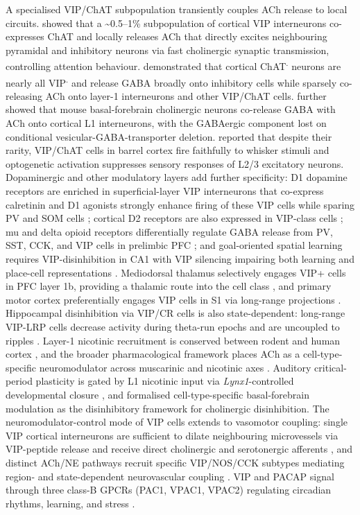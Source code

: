 \documentclass[11pt]{article}
\begin{document}
A specialised VIP/ChAT subpopulation transiently couples ACh release to local circuits. \citet{Obermayer2019} showed that a {\textasciitilde}0.5--1\% subpopulation of cortical VIP interneurons co-expresses ChAT and locally releases ACh that directly excites neighbouring pyramidal and inhibitory neurons via fast cholinergic synaptic transmission, controlling attention behaviour. \citet{Granger2020} demonstrated that cortical ChAT\textsuperscript{.} neurons are nearly all VIP\textsuperscript{.} and release GABA broadly onto inhibitory cells while sparsely co-releasing ACh onto layer-1 interneurons and other VIP/ChAT cells. \citet{Saunders2015} further showed that mouse basal-forebrain cholinergic neurons co-release GABA with ACh onto cortical L1 interneurons, with the GABAergic component lost on conditional vesicular-GABA-transporter deletion. \citet{Dudai2020} reported that despite their rarity, VIP/ChAT cells in barrel cortex fire faithfully to whisker stimuli and optogenetic activation suppresses sensory responses of L2/3 excitatory neurons. Dopaminergic and other modulatory layers add further specificity: D1 dopamine receptors are enriched in superficial-layer VIP interneurons that co-express calretinin and D1 agonists strongly enhance firing of these VIP cells while sparing PV and SOM cells \citep{Anastasiades2019}; cortical D2 receptors are also expressed in VIP-class cells \citep{Khlghatyan2019}; mu and delta opioid receptors differentially regulate GABA release from PV, SST, CCK, and VIP cells in prelimbic PFC \citep{Cole2025}; and goal-oriented spatial learning requires VIP-disinhibition in CA1 with VIP silencing impairing both learning and place-cell representations \citep{Turi2019}. Mediodorsal thalamus selectively engages VIP+ cells in PFC layer 1b, providing a thalamic route into the cell class \citep{Anastasiades2021a}, and primary motor cortex preferentially engages VIP cells in S1 via long-range projections \citep{Naskar2021}. Hippocampal disinhibition via VIP/CR cells is also state-dependent: long-range VIP-LRP cells decrease activity during theta-run epochs and are uncoupled to ripples \citep{Francavilla2018a}. Layer-1 nicotinic recruitment is conserved between rodent and human cortex \citep{Poorthuis2018}, and the broader pharmacological framework places ACh as a cell-type-specific neuromodulator across muscarinic and nicotinic axes \citep{Picciotto2012}. Auditory critical-period plasticity is gated by L1 nicotinic input via \textit{Lynx1}-controlled developmental closure \citep{Takesian2018}, and \citet{Alitto2013} formalised cell-type-specific basal-forebrain modulation as the disinhibitory framework for cholinergic disinhibition. The neuromodulator-control mode of VIP cells extends to vasomotor coupling: single VIP cortical interneurons are sufficient to dilate neighbouring microvessels via VIP-peptide release and receive direct cholinergic and serotonergic afferents \citep{Cauli2004}, and distinct ACh/NE pathways recruit specific VIP/NOS/CCK subtypes mediating region- and state-dependent neurovascular coupling \citep{Lecrux2016}. VIP and PACAP signal through three class-B GPCRs (PAC1, VPAC1, VPAC2) regulating circadian rhythms, learning, and stress \citep{Harmar2012}.
\end{document}
